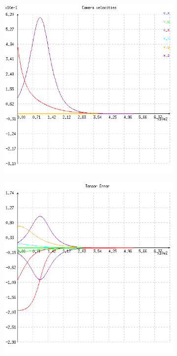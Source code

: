 \begin{figure}[ht!]
\begin{subfigure}{.48\linewidth}
    \caption{}
    \label{fig:ex4cscene}
  \end{subfigure}
  \\
  \begin{subfigure}{.48\linewidth}
    \centering
    \includegraphics[width=\linewidth]{figures/plots/ex4cvelocity.png}
    \caption{}
    \label{fig:ex4cvelocity}
  \end{subfigure}
  \begin{subfigure}{.48\linewidth}
    \centering
    \includegraphics[width=\linewidth]{figures/plots/ex4cerror.png}

\end{subfigure}
\end{figure}
